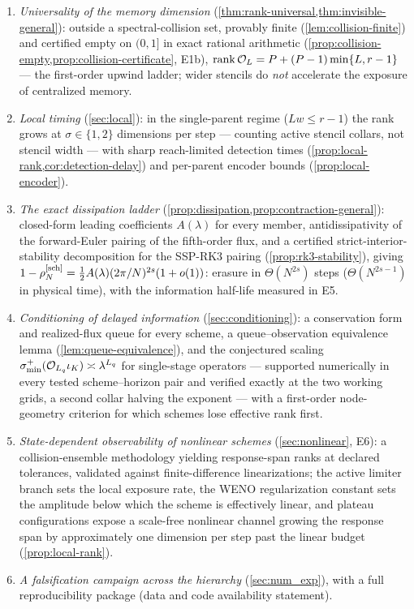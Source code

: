 \documentclass[pdflatex,sn-mathphys-num]{sn-jnl}%
\theoremstyle{thmstyleone}%
\theoremstyle{thmstyletwo}%
\theoremstyle{thmstylethree}%
\DeclareMathOperator{\rank}{rank}
\newcommand{\OL}{{\cal O}_L}
\begin{document}
\begin{enumerate}
\item \emph{Universality of the memory dimension} (\cref{thm:rank-universal,thm:invisible-general}): outside a spectral-collision set, provably finite (\cref{lem:collision-finite}) and certified empty on $(0,1]$ in exact rational arithmetic (\cref{prop:collision-empty,prop:collision-certificate}, E1b), $\rank\OL=P+(P-1)\min\{L,r-1\}$ --- the first-order upwind ladder; wider stencils do \emph{not} accelerate the exposure of centralized memory.
\item \emph{Local timing} (\cref{sec:local}): in the single-parent regime ($Lw\le r-1$) the rank grows at $\sigma\in\{1,2\}$ dimensions per step --- counting active stencil collars, not stencil width --- with sharp reach-limited detection times (\cref{prop:local-rank,cor:detection-delay}) and per-parent encoder bounds (\cref{prop:local-encoder}).
\item \emph{The exact dissipation ladder} (\cref{prop:dissipation,prop:contraction-general}): closed-form leading coefficients $A(\lambda)$ for every member, antidissipativity of the forward-Euler pairing of the fifth-order flux, and a certified strict-interior-stability decomposition for the SSP-RK3 pairing (\cref{prop:rk3-stability}), giving $1-\rho_N^{[\rm sch]}=\tfrac12A(\lambda)(2\pi/N)^{2s}(1+o(1))$: erasure in $\Theta(N^{2s})$ steps ($\Theta(N^{2s-1})$ in physical time), with the information half-life measured in E5.
\item \emph{Conditioning of delayed information} (\cref{sec:conditioning}): a conservation form and realized-flux queue for every scheme, a queue--observation equivalence lemma (\cref{lem:queue-equivalence}), and the conjectured scaling $\sigma^{+}_{\min}({\cal O}_{L_q}\iota_K)\asymp\lambda^{L_q}$ for single-stage operators --- supported numerically in every tested scheme--horizon pair and verified exactly at the two working grids, a second collar halving the exponent --- with a first-order node-geometry criterion for which schemes lose effective rank first.
\item \emph{State-dependent observability of nonlinear schemes} (\cref{sec:nonlinear}, E6): a collision-ensemble methodology yielding response-span ranks at declared tolerances, validated against finite-difference linearizations; the active limiter branch sets the local exposure rate, the WENO regularization constant sets the amplitude below which the scheme is effectively linear, and plateau configurations expose a scale-free nonlinear channel growing the response span by approximately one dimension per step past the linear budget (\cref{prop:local-rank}).
\item \emph{A falsification campaign across the hierarchy} (\cref{sec:num_exp}), with a full reproducibility package (data and code availability statement).
\end{enumerate}
\end{document}
